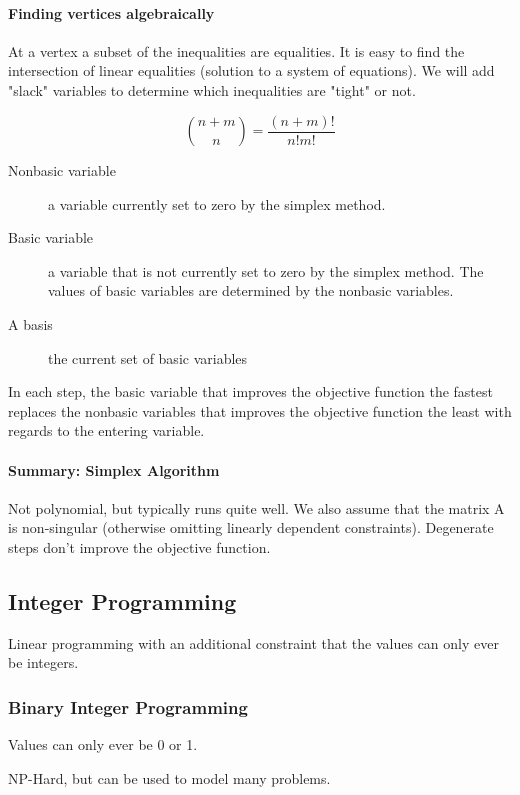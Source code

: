 \documentclass[a4paper]{article}
\begin{document}
\paragraph{Finding vertices algebraically}
At a vertex a subset of the inequalities are equalities.
It is easy to find the intersection of linear equalities (solution to a system of equations).
We will add "slack" variables to determine which inequalities are "tight" or not.

\[\binom{n+m}{n} = \frac{(n+m)!}{n!m!}\]

\begin{description}
  \item[Nonbasic variable] a variable currently set to zero by the simplex method.
  \item[Basic variable] a variable that is not currently set to zero by the simplex method.
    The values of basic variables are determined by the nonbasic variables.
  \item[A basis] the current set of basic variables
\end{description}

In each step, the basic variable that improves the objective function the fastest replaces the nonbasic variables that improves the objective function the least with regards to the entering variable. 


\paragraph{Summary: Simplex Algorithm}
Not polynomial, but typically runs quite well.
We also assume that the matrix A is non-singular (otherwise omitting linearly dependent constraints).
Degenerate steps don't improve the objective function.

\subsection{Integer Programming}
Linear programming with an additional constraint that the values can only ever be integers.

\subsubsection{Binary Integer Programming}
Values can only ever be 0 or 1.

NP-Hard, but can be used to model many problems.
\end{document}

